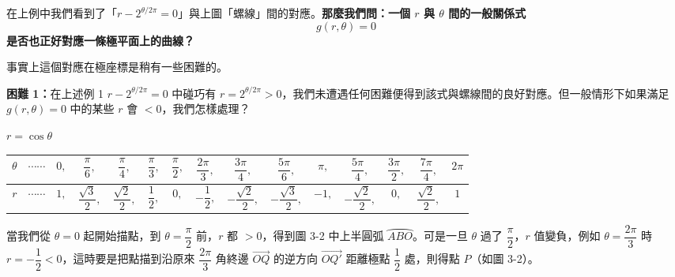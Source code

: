 在上例中我們看到了「$r - 2^{\theta/2\pi} = 0$」與上圖「螺線」間的對應。\textbf{那麼我們問：一個 $r$ 與 $\theta$ 間的一般關係式}
\begin{equation}\label{eq:b5s-1-3-2}
  g(r, \theta) = 0 \tag{2}
\end{equation}
\textbf{是否也正好對應一條極平面上的曲線？}

事實上這個對應在極座標是稍有一些困難的。

\medskip
\noindent\textbf{困難 1：}在上述例 1 $r - 2^{\theta/2\pi} = 0$ 中碰巧有 $r = 2^{\theta/2\pi} > 0$，我們未遭遇任何困難便得到該式與螺線間的良好對應。但一般情形下如果滿足 $g(r, \theta) = 0$ 中的某些 $r$ 會 $< 0$，我們怎樣處理？

\medskip
\begin{example}\label{ex:b5s-1-3-2}
$r = \cos\theta$

\begin{center}
\renewcommand{\arraystretch}{1.6}
\setlength{\tabcolsep}{4.5pt}
\small
\begin{tabular}{c|cccccccccccccc}
$\theta$ & $\cdots\cdots$ & $0,$ & $\dfrac{\pi}{6},$ & $\dfrac{\pi}{4},$ & $\dfrac{\pi}{3},$ & $\dfrac{\pi}{2},$ & $\dfrac{2\pi}{3},$ & $\dfrac{3\pi}{4},$ & $\dfrac{5\pi}{6},$ & $\pi,$ & $\dfrac{5\pi}{4},$ & $\dfrac{3\pi}{2},$ & $\dfrac{7\pi}{4},$ & $2\pi$ \\[4pt]
\hline
$r$ & $\cdots\cdots$ & $1,$ & $\dfrac{\sqrt{3}}{2},$ & $\dfrac{\sqrt{2}}{2},$ & $\dfrac{1}{2},$ & $0,$ & $-\dfrac{1}{2},$ & $-\dfrac{\sqrt{2}}{2},$ & $-\dfrac{\sqrt{3}}{2},$ & $-1,$ & $-\dfrac{\sqrt{2}}{2},$ & $0,$ & $\dfrac{\sqrt{2}}{2},$ & $1$
\end{tabular}
\end{center}

當我們從 $\theta = 0$ 起開始描點，到 $\theta = \dfrac{\pi}{2}$ 前，$r$ 都 $> 0$，得到圖 3-2 中上半圓弧 $\wideparen{ABO}$。可是一旦 $\theta$ 過了 $\dfrac{\pi}{2}$，$r$ 值變負，例如 $\theta = \dfrac{2\pi}{3}$ 時 $r = -\dfrac{1}{2} < 0$，這時要是把點描到沿原來 $\dfrac{2\pi}{3}$ 角終邊 $\vec{OQ}$ 的逆方向 $\vec{OQ'}$ 距離極點 $\dfrac{1}{2}$ 處，則得點 $P$（如圖 3-2）。

\begin{figure}[H]
\centering
{}
\end{figure}
\end{example}
